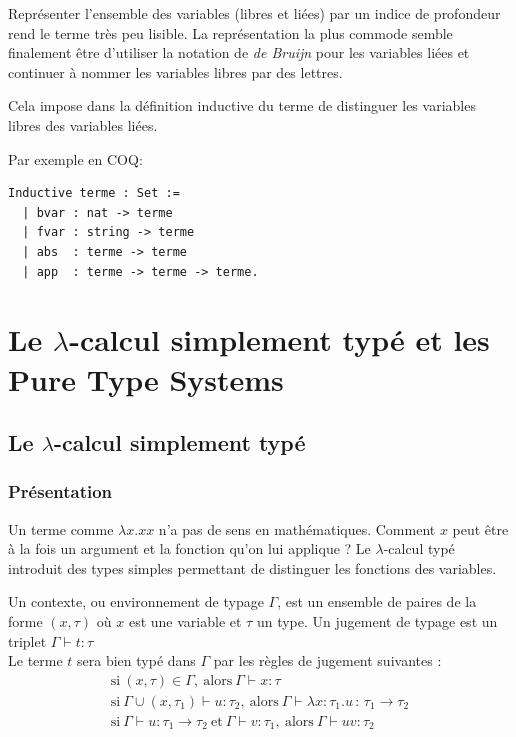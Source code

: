 \documentclass[11pt]{book}
\begin{document}
Représenter l'ensemble des variables (libres et liées) par un indice de profondeur rend le terme très peu lisible.
La représentation la plus commode semble finalement être d'utiliser la notation de \textit{de Bruijn}  pour les variables liées
 et continuer
à nommer les variables libres par des lettres.

Cela impose dans la définition inductive du terme de distinguer les variables libres des variables liées.

Par exemple en COQ:
\begin{Verbatim}
Inductive terme : Set :=
  | bvar : nat -> terme
  | fvar : string -> terme
  | abs  : terme -> terme
  | app  : terme -> terme -> terme.
\end{Verbatim}

\chapter{Le $\lambda$-calcul simplement typé et les Pure Type Systems}
\section{Le $\lambda$-calcul simplement typé}
\subsection{Présentation}
Un terme comme $\lambda x.xx$ n'a pas de sens en mathématiques. Comment $x$ peut être à la fois un argument et la fonction qu'on
lui applique ? Le $\lambda$-calcul typé introduit des types simples permettant de distinguer les fonctions des variables.

Un contexte, ou environnement de typage $\Gamma$, est un ensemble de paires de la forme 
$( x , \tau )$  où $x$ est une variable et $\tau$ un type.
 Un jugement de typage est un triplet $\Gamma \vdash t:\tau$  \\

 Le terme $t$ sera bien typé dans $\Gamma$  par les règles de jugement suivantes :
\begin{gather*}
  \mathrm{si}\ (x,\tau ) \in \Gamma  ,\  \mathrm{alors}\ \Gamma \vdash x:\tau  \\
  \mathrm{si}\  \Gamma \cup (x,\tau _{1})\vdash u:\tau _{2},\  \mathrm{alors}\ \Gamma \vdash \lambda x\!:\!\tau _{1}.u\,:\,\tau _{1}\rightarrow \tau _{2} \\
  \mathrm{si}\ \Gamma \vdash u:\tau _{1}\rightarrow \tau _{2}\ \mathrm{et}\ \Gamma \vdash v:\tau _{1},\  
    \mathrm{alors}\  \Gamma \vdash uv:\tau _{2} \\ 
\end{gather*}
\end{document}
